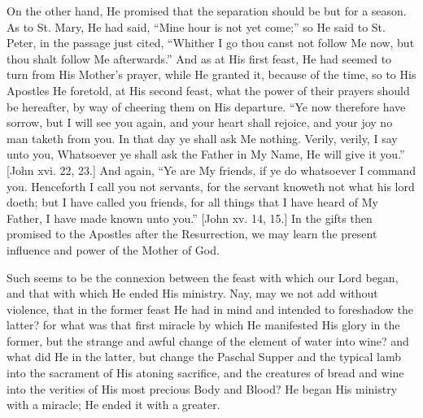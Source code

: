 On the other hand, He promised that the separation should be but
for a season. As to St. Mary, He had said, ``Mine hour is not yet
come;'' so He said to St. Peter, in the passage just cited,
``Whither I go thou canst not follow Me now, but thou shalt follow
Me afterwards.'' And as at His first feast, He had seemed to turn
from His Mother's prayer, while He granted it, because of the time, so
to His Apostles He foretold, at His second feast, what the power of
their prayers should be hereafter, by way of cheering them on His
departure. ``Ye now therefore have sorrow, but I will see you
again, and your heart shall rejoice, and your joy no man taketh from
you. In that day ye shall ask Me nothing. Verily, verily, I say unto
you, Whatsoever ye shall ask the Father in My Name, He will give it
you.'' [John xvi. 22, 23.] And again, ``Ye are My friends, if
ye do whatsoever I command you. Henceforth I call you not servants,
for the servant knoweth not what his lord doeth; but I have called you
friends, for all things that I have heard of My Father, I have made
known unto you.'' [John xv. 14, 15.] In the gifts then promised to
the Apostles after the Resurrection, we may learn the present
influence and power of the Mother of God.

Such seems to be the connexion between the feast with which our
Lord began, and that with which He ended His ministry. Nay, may we not
add without violence, that in the former feast He had in mind and
intended to foreshadow the latter? for what was that first miracle by
which He manifested His glory in the former, but the strange and awful
change of the element of water into wine? and what did He in the
latter, but change the Paschal Supper and the typical lamb into the
sacrament of His atoning sacrifice, and the creatures of bread and
wine into the verities of His most precious Body and Blood? He began
His ministry with a miracle; He ended it with a greater.

